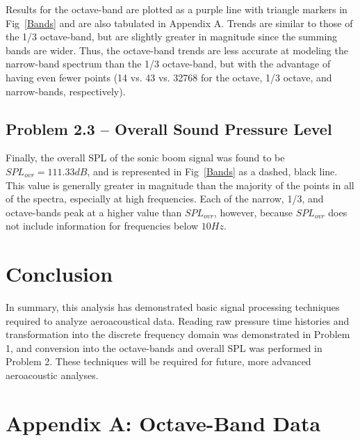 \documentclass[twocolumn,10pt]{asme2ej}
\begin{document}
Results for the octave-band are plotted as a purple line with triangle markers in Fig~\ref{Bands} and are also tabulated in Appendix A. Trends are similar to those of the 1/3 octave-band, but are slightly greater in magnitude since the summing bands are wider.  Thus, the octave-band trends are less accurate at modeling the narrow-band spectrum than the 1/3 octave-band, but with the advantage of having even fewer points (14 vs. 43 vs. 32768 for the octave, 1/3 octave, and narrow-bands, respectively).

\clearpage

\subsection{Problem 2.3 -- Overall Sound Pressure Level}

Finally, the overall SPL of the sonic boom signal was found to be $\boxed{SPL_{ovr}=111.33dB}$, and is represented in Fig~\ref{Bands} as a dashed, black line.  This value is generally greater in magnitude than the majority of the points in all of the spectra, especially at high frequencies.  Each of the narrow, 1/3, and octave-bands peak at a higher value than $SPL_{ovr}$, however, because $SPL_{ovr}$ does not include information for frequencies below $10Hz$.





\section{Conclusion}

In summary, this analysis has demonstrated basic signal processing techniques required to analyze aeroacoustical data.  Reading raw pressure time histories and transformation into the discrete frequency domain was demonstrated in Problem 1, and conversion into the octave-bands and overall SPL was performed in Problem 2.  These techniques will be required for future, more advanced aeroacoustic analyses.

\section*{Appendix A: Octave-Band Data}


\end{document}
